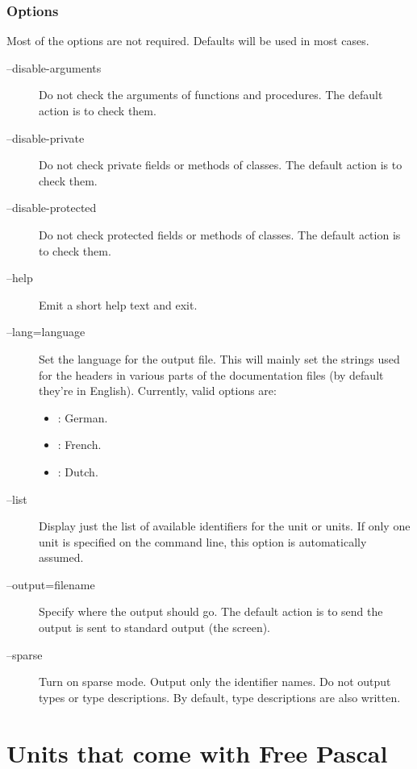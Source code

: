 \subsection{Options}
Most of the  options are not required. Defaults will be used in most
cases.

\begin{description}
\item[--disable-arguments] Do not check the arguments of functions
and procedures. The default action is to check them.
\item[--disable-private] Do not check private fields or methods of
classes. The default action is to check them.
\item[--disable-protected] Do not check protected fields or methods of
classes. The default action is to check them.
\item[--help] Emit a short help text and exit.
\item[--lang=language] Set the language for the output file. This will mainly
set the strings used for the headers in various parts of the documentation files
(by default they're in English). Currently, valid options are:
\begin{itemize}
\item {}: German.
\item {}: French.
\item {}: Dutch.
\end{itemize}
\item[--list] Display just the list of available identifiers for the unit
or units. If only one unit is specified on the command line, this option
is automatically assumed.
\item[--output=filename] Specify where the output should go. The default
action is to send the output is sent to standard output (the screen).
\item[--sparse] Turn on sparse mode. Output only the identifier names.
Do not output types or type descriptions. By default, type descriptions
are also written.
\end{description}

\chapter{Units that come with Free Pascal}
\label{ch:Units}

